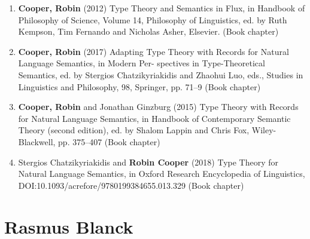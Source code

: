 \documentclass{article}
\begin{document}
\begin{enumerate}
\item \textbf{Cooper, Robin} (2012) Type Theory and Semantics in Flux, in Handbook of Philosophy of Science, Volume 14,
Philosophy of Linguistics, ed. by Ruth Kempson, Tim Fernando and Nicholas Asher, Elsevier. (Book chapter)

\item \textbf{Cooper, Robin} (2017) Adapting Type Theory with Records for Natural Language Semantics, in Modern Per- spectives in Type-Theoretical Semantics, ed. by Stergios Chatzikyriakidis and Zhaohui Luo, eds., Studies in Linguistics and Philosophy, 98, Springer, pp. 71–9 (Book chapter)

\item \textbf{Cooper, Robin} and Jonathan Ginzburg (2015) Type Theory with Records for Natural Language Semantics, in Handbook of Contemporary Semantic Theory (second edition), ed. by Shalom Lappin and Chris Fox, Wiley-Blackwell, pp. 375–407 (Book chapter)


\item Stergios Chatzikyriakidis and \textbf{Robin Cooper} (2018) Type Theory for Natural Language Semantics, in Oxford Research Encyclopedia of Linguistics,\\ DOI:10.1093/acrefore/9780199384655.013.329 (Book chapter)
\end{enumerate}

\newpage
{}
\section*{Rasmus Blanck}
\end{document}
